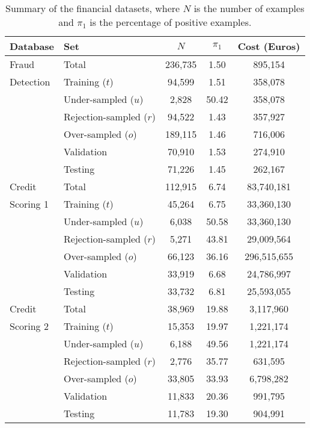 \begin{table}[ht!]
  \centering
  \footnotesize
  \begin{tabular}{l l c c c } %
    \hline
    \textbf{Database}& \textbf{Set}&  $N$ & $\pi_1$ & Cost (Euros) \\
    \hline
    Fraud &Total&236,735&1.50&895,154\\
    Detection&  Training ($t$)&94,599&1.51&358,078\\
    &Under-sampled ($u$)&2,828&50.42&358,078\\
    &Rejection-sampled ($r$)&94,522&1.43&357,927\\
    &Over-sampled ($o$)&189,115&1.46&716,006\\
    &Validation&70,910&1.53&274,910\\
    &Testing&71,226&1.45&262,167\\
    \hline
    Credit  & Total&112,915&6.74&83,740,181\\
    Scoring 1 & Training ($t$)&45,264&6.75&33,360,130\\
    &Under-sampled ($u$)&6,038&50.58&33,360,130\\
    &Rejection-sampled ($r$)&5,271&43.81&29,009,564\\
    &Over-sampled ($o$)&66,123&36.16&296,515,655\\
    &Validation&33,919&6.68&24,786,997\\
    &Testing&33,732&6.81&25,593,055\\
    \hline
    Credit &Total&38,969&19.88&3,117,960\\
    Scoring 2&Training ($t$)&15,353&19.97&1,221,174\\
    &Under-sampled ($u$)&6,188&49.56&1,221,174\\
    &Rejection-sampled ($r$)&2,776&35.77&631,595\\
    &Over-sampled ($o$)&33,805&33.93&6,798,282\\
    &Validation&11,833&20.36&991,795\\
    &Testing&11,783&19.30&904,991\\
    \hline
  \end{tabular}
  \caption{Summary of the financial datasets, where $N$ is the number of examples and $\pi_1$ is 
  the percentage of positive examples.}
  \label{tab:4:databases}
\end{table}

\makeatletter
\setlength{\@fptop}{0pt}
\makeatother